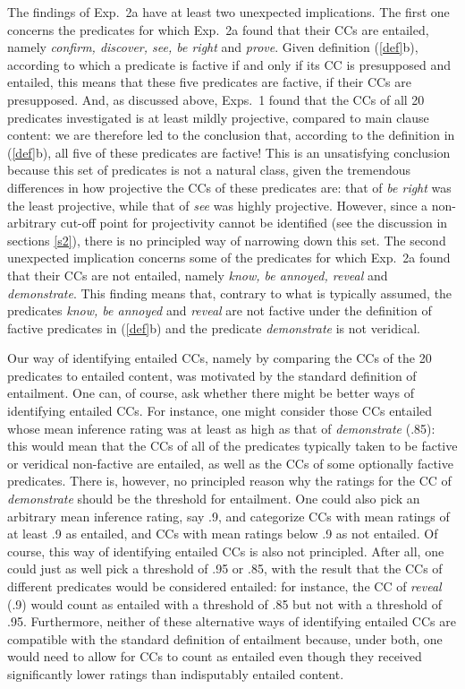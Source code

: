 \documentclass[11pt,fleqn]{article}
\newcommand{\6}{\mbox{$[\hspace*{-.6mm}[$}}
\newcommand{\9}{\mbox{$]\hspace*{-.6mm}]$}}
\begin{document}
The findings of Exp.~2a have at least two unexpected implications. The first one concerns the predicates for which Exp.~2a found that their CCs are entailed, namely {\em confirm, discover, see, be right} and {\em prove}. Given definition (\ref{def}b), according to which a predicate is factive if and only if its CC is presupposed and entailed, this means that these five predicates are factive, if their CCs are presupposed. And, as discussed above, Exps.~1 found that the CCs of all 20 predicates investigated is at least mildly projective, compared to main clause content: we are therefore led to the conclusion that, according to the definition in (\ref{def}b), all five of these predicates are factive! This is an unsatisfying conclusion because this set of predicates is not a natural class, given the tremendous differences in how projective the CCs of these predicates are: that of {\em be right} was the least projective, while that of {\em see} was highly projective. However, since a non-arbitrary cut-off point for projectivity cannot be identified (see the discussion in sections \ref{s2}), there is no principled way of narrowing down this set. The second unexpected implication concerns some of the predicates for which Exp.~2a found that their CCs are not entailed, namely {\em know, be annoyed, reveal} and {\em demonstrate}. This finding means that, contrary to what is typically assumed, the predicates {\em know, be annoyed} and {\em reveal} are not factive under the definition of factive predicates in (\ref{def}b) and the predicate {\em demonstrate} is not veridical.

Our way of identifying entailed CCs, namely by comparing the CCs of the 20 predicates to entailed content, was motivated by the standard definition of entailment. One can, of course, ask whether there might be better ways of identifying entailed CCs. For instance, one might consider those CCs entailed whose mean inference rating was at least as high as that of {\em demonstrate} (.85): this would mean that the CCs of all of the predicates typically taken to be factive or veridical non-factive are entailed, as well as the CCs of some optionally factive predicates. There is, however, no principled reason why the ratings for the CC of {\em demonstrate} should be the threshold for entailment. One could also pick an arbitrary mean inference rating, say .9, and categorize CCs with mean ratings of at least .9 as entailed, and CCs with mean ratings below .9 as not entailed. Of course, this way of identifying entailed CCs is also not principled. After all, one could just as well pick a threshold of .95 or .85, with the result that the CCs of different predicates would be considered entailed: for instance, the CC of {\em reveal} (.9) would count as entailed with a threshold of .85 but not with a threshold of .95. Furthermore, neither of these alternative ways of identifying entailed CCs are compatible with the standard definition of entailment because, under both, one would need to allow for CCs to count as entailed even though they received significantly lower ratings than indisputably entailed content.
\end{document}
